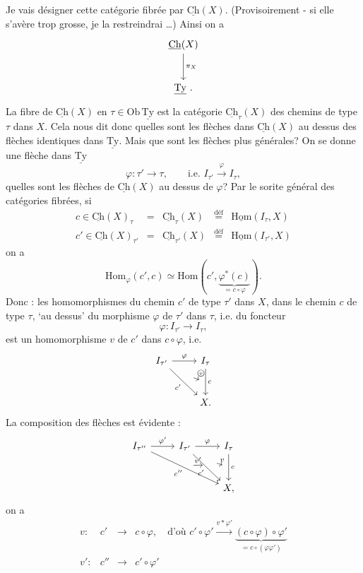 \documentclass[11pt]{article}
\newcommand{\printedpage}[1]{\marginpar{\footnotesize p.~#1}}
\newcommand{\msp}[1]{\marginpar{\footnotesize [#1]}}
\newcommand{\uHom}{\underline{\mathrm{Hom}}}
\newcommand{\Hom}{\mathrm{Hom}}
\newcommand{\uCh}{\underline{\mathrm{Ch}}}
\newcommand{\uTy}{\underline{\mathrm{Ty}}}
\newcommand{\circled}[1]{\text{\textcircled{$\scriptstyle #1$}}}
\begin{document}
\msp{page 27}
Je vais désigner cette catégorie fibrée par $\uCh(X)$. (Provisoirement - si elle s'avère trop grosse, je la restreindrai \dots) Ainsi on a
\[
\begin{tikzcd}[row sep=large]
\uCh(X) \arrow[d, "\pi_X"] \\
\uTy\ .
\end{tikzcd}
\]
La fibre de $\uCh(X)$ en $\tau\in\mathrm{Ob}\,\uTy$ est la catégorie $\uCh_\tau(X)$ des chemins de type $\tau$ dans $X$. Cela nous dit donc quelles sont les flèches dans $\uCh(X)$ au dessus des flèches identiques dans $\uTy$. Mais que sont les flèches plus générales? On se donne une flèche dans $\uTy$
\[
\varphi : \tau' \longrightarrow \tau, \qquad \text{i.e. } I_{\tau'} \xrightarrow{\varphi} I_\tau,
\]
quelles sont les flèches de $\uCh(X)$ au dessus de $\varphi$? Par le sorite général des catégories fibrées, si
\[
\begin{array}{lclcl}
c\in\uCh(X)_\tau & = & \uCh_\tau(X) & \overset{\text{déf}}{=} & \uHom(I_\tau,X)\\[1ex]
c'\in\uCh(X)_{\tau'} & = & \uCh_{\tau'}(X) & \overset{\text{déf}}{=} & \uHom(I_{\tau'},X)
\end{array}
\]
on a
\[
\boxed{\Hom_\varphi(c',c)\simeq\Hom(c',\underbrace{\varphi^*(c)}_{=c\circ\varphi}).}
\]
Donc : les homomorphismes du
\printedpage{18}
\msp{page 28}
chemin $c'$ de type $\tau'$ dans $X$, dans le chemin $c$ de type $\tau$, ‘au dessus’ du morphisme $\varphi$ de $\tau'$ dans $\tau$, i.e. du foncteur
\[
\varphi : I_{\tau'} \longrightarrow I_\tau,
\]
est un homomorphisme $v$ de $c'$ dans $c\circ\varphi$, i.e.
\[
\begin{tikzcd}[row sep=large]
I_{\tau'} \arrow[r, "\varphi"] \arrow[dr, "c'"', ""{name=A}] & I_\tau \arrow[d, "c", ""'{name=B}] \\
& X.
\arrow[from=A, to=B, bend left=20, shorten <=6pt, shorten >=2pt, "\circled{v}"]
\end{tikzcd}
\]
La composition des flèches est évidente :
\[
\begin{tikzcd}[row sep=large]
I_{\tau''} \arrow[r, "\varphi'"] \arrow[drr, "c''"', ""{name=C}] & I_{\tau'} \arrow[r, "\varphi"] \arrow[dr, "c'"', ""{name=A}] & I_\tau \arrow[d, "c", ""'{name=B}] \\
& & X,
\arrow[from=A, to=B, bend left=20, shorten <=6pt, shorten >=2pt, "v"]
\arrow[from=C, to=A, shorten <=4pt, shorten >=4pt, "v'"]
\end{tikzcd}
\]
on a
\[
\begin{array}{rccl}
v : & c' & \longrightarrow & c\circ\varphi, \quad \text{d'où } c'\circ\varphi' \xrightarrow{v*\varphi'} \underbrace{(c\circ\varphi)\circ\varphi'}_{=c\circ(\varphi\varphi')}\\[3ex]
v' : & c'' & \longrightarrow & c'\circ\varphi'
\end{array}
\]
\end{document}

